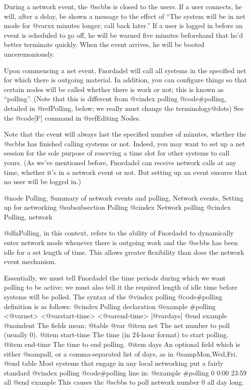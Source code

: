 During a network event, the @sc{bbs} is closed to the
users.  If a user connects, he will, after a delay, be
shown a message to the effect of ``The system will be in
net mode for @var{xx} minutes longer; call back later.'' If a
user is logged in before an event is scheduled to go off,
he will be warned five minutes beforehand that he'd better
terminate quickly.  When the event arrives, he will be
booted unceremoniously.

Upon commencing a net event, Fnordadel will call
all systems in the specified net for which there is
outgoing material.  In addition, you can configure things
so that certain nodes will be called whether there is work
or not; this is known as ``polling''.  (Note that this is
different from
@vindex polling
@code{#polling}, detailed in @ref{Polling},
below; we really must change the terminology@dots{})  See the @code{[F]}
command in @ref{Editing Nodes}.

Note that the event will always last the specified
number of minutes, whether the @sc{bbs} has finished calling
systems or not.  Indeed, you may want to set up a net
session for the sole purpose of reserving a time slot for
other systems to call yours.  (As we've mentioned before,
Fnordadel can receive network calls at any time, whether
it's in a network event or not.  But setting up an event
ensures that no user will be logged in.)

@node Polling, Summary of network events and polling, Network events, Setting up for networking
@subsubsection Polling
@cindex Network polling
@cindex Polling, network

@dfn{Polling}, in this context, refers to the ability
of Fnordadel to dynamically enter network mode whenever
there is outgoing work and the @sc{bbs} has been idle for a set
length of time.  This allows greater flexibility than does
the network event mechanism.

Essentially, we must tell Fnordadel the time
periods during which we want polling to be active; we must
also tell it the required length of idle time before
systems will be polled.  The syntax of the
@vindex polling
@code{#polling}
definition is as follows:
@cindex Polling declaration
@example
#polling <@var{net}> <@var{start-time}> <@var{end-time}> [@var{days}]
@end example
@noindent
The fields mean:
@table @var
@item net
The net number to poll (usually 0).
@item start-time
The time (in 24-hour format) to start polling.
@item end-time
The time to end polling.
@item days
An optional field which is either
@samp{all}, or a comma-separated list of days, as in
@samp{Mon,Wed,Fri}.
@end table
Most systems that engage in any local networking
put a fairly standard
@vindex polling
@code{#polling} line in:
@example
#polling 0 0:00 23:59 all
@end example
This causes the @sc{bbs} to poll network number 0 all
day long.

